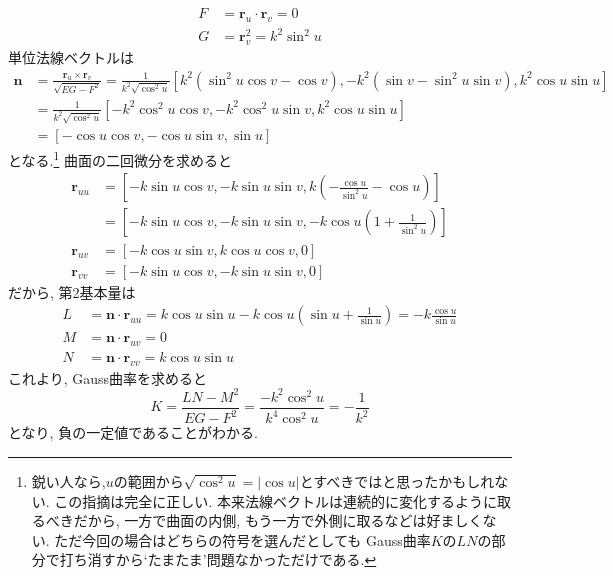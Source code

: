 \documentclass[a4j,dvipdfmx]{jsarticle}
\begin{document}
\begin{qparts}
\begin{align*}
                F&=\bm{r}_u\cdot \bm{r}_v = 0\\
                G&=\bm{r}_v^2=k^2\sin^2 u
            \end{align*}
            単位法線ベクトルは
            \begin{align*}
                \bm{n}&=\frac{\bm{r}_u\times\bm{r}_v}{\sqrt{EG-F^2}}=\frac{1}{k^2\sqrt{\cos^2u}}[k^2(\sin^2u\cos v-\cos v),-k^2(\sin v-\sin^2 u\sin v),k^2\cos u\sin u]\\
                      &=\frac{1}{k^2\sqrt{\cos^2u}}[-k^2\cos^2u\cos v,-k^2\cos^2u\sin v,k^2\cos u\sin u]\\
                      &=[-\cos u\cos v,-\cos u\sin v,\sin u]
            \end{align*}
            となる.\footnote{鋭い人なら,$u$の範囲から$\sqrt{\cos^2 u}=|\cos u|$とすべきではと思ったかもしれない. この指摘は完全に正しい. 本来法線ベクトルは連続的に変化するように取るべきだから, 一方で曲面の内側, もう一方で外側に取るなどは好ましくない. ただ今回の場合はどちらの符号を選んだとしても
            Gauss曲率$K$の$LN$の部分で打ち消すから`たまたま'問題なかっただけである.}
            曲面の二回微分を求めると
            \begin{align*}
                \bm{r}_{uu}&=\left[-k\sin u\cos v,-k\sin u\sin v,k\left(-\frac{\cos u}{\sin^2 u}-\cos u\right)\right]\\
                           &=\left[-k\sin u\cos v,-k\sin u\sin v,-k\cos u\left(1+\frac{1}{\sin^2 u}\right)\right]\\
                \bm{r}_{uv}&=\left[-k\cos u\sin v,k\cos u\cos v,0\right]\\
                \bm{r}_{vv}&=\left[-k\sin u\cos v,-k\sin u\sin v,0\right]
            \end{align*}
            だから, 第2基本量は
            \begin{align*}
                L&=\bm{n}\cdot\bm{r}_{uu}=k\cos u\sin u-k\cos u\left(\sin u+\frac{1}{\sin u}\right)=-k\frac{\cos u}{\sin u}\\
                M&=\bm{n}\cdot \bm{r}_{uv} = 0\\
                N&=\bm{n}\cdot\bm{r}_{vv}=k\cos u\sin u
            \end{align*}
            これより, Gauss曲率を求めると
            \begin{equation*}
                K=\frac{LN-M^2}{EG-F^2}=\frac{-k^2\cos^2u}{k^4\cos^2u}=-\frac{1}{k^2}
            \end{equation*}
            となり, 負の一定値であることがわかる.
        \end{qparts}
    \clearpage
\end{document}
